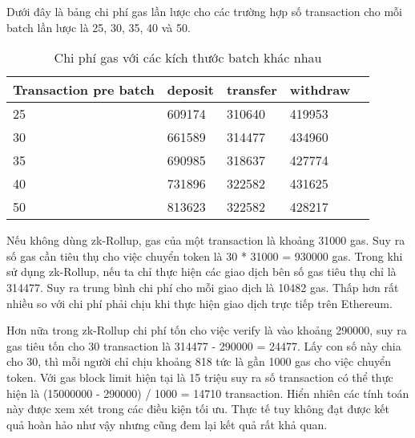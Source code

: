 \documentclass[../thesis.tex]{subfiles}
\begin{document}
Dưới đây là bảng chi phí gas lần lược cho các trường hợp số transaction cho mỗi batch lần lược là 25, 30, 35, 40 và 50.

\begin{table}[H]
\centering
\begin{tabular}{|l|l|l|l|l|}
\hline
 Transaction pre batch & deposit &  transfer & withdraw  \\ \hline
25 & 609174 &  310640 & 419953  \\ \hline
30 & 661589 &  314477& 434960  \\ \hline
35 & 690985 & 318637 & 427774  \\ \hline
40 & 731896 & 322582 & 431625 \\ \hline
50 & 813623 & 322582 & 428217 \\ \hline

\end{tabular}
\caption{Chi phí gas với các kích thước batch khác nhau}
\label{tab:my-table}
\end{table}

Nếu không dùng zk-Rollup, gas của một transaction là khoảng 31000 gas. Suy ra số gas cần tiêu thụ cho việc chuyển token là 30 * 31000 = 930000 gas. Trong khi sử dụng zk-Rollup, nếu ta chỉ thực hiện các giao dịch bên số gas tiêu thụ chỉ là 314477. Suy ra trung bình chi phí cho mỗi giao dịch là 10482 gas. Thấp hơn rất nhiều so với chi phí phải chịu khi thực hiện giao dịch trực tiếp trên Ethereum.

Hơn nữa trong zk-Rollup chi phí tốn cho việc verify là vào khoảng 290000, suy ra gas tiêu tốn cho 30 transaction là 314477 - 290000 = 24477. Lấy con số này chia cho 30, thì mỗi người chỉ chịu khoảng 818 tức là gần 1000 gas cho việc chuyển token. Với gas block limit hiện tại là 15 triệu suy ra số transaction có thể thực hiện là (15000000 - 290000) / 1000 = 14710 transaction. Hiển nhiên các tính toán này được xem xét trong các điều kiện tối ưu. 
Thực tế tuy không đạt được kết quả hoàn hảo như vậy nhưng cũng đem lại kết quả rất khả quan. 
\end{document}
